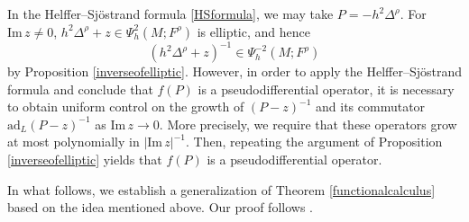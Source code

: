 \documentclass[11pt,oneside,reqno]{amsart}
\theoremstyle{definition}
\numberwithin{equation}{section}
\theoremstyle{plain}
\begin{document}
In the Helffer–Sjöstrand formula \eqref{HSformula}, we may take $P=-h^2\Delta^{\rho}$. For $\mathrm{Im}\,z\neq 0$, $h^2\Delta^{\rho} +z\in \Psi^{2}_h(M;F^\rho)$ is elliptic, and hence 
\begin{equation*}
    (h^2\Delta^{\rho} + z)^{-1}\in \Psi^{-2}_h(M;F^\rho)
\end{equation*}
by Proposition \ref{inverseofelliptic}. However, in order
to apply the Helffer–Sjöstrand formula and conclude that $f(P) $ is a pseudodifferential operator, 
it is necessary to obtain uniform control on the growth of $(P-z)^{-1}$ and its commutator $\mathrm{ad}_{L} (P-z)^{-1}$ as $\mathrm{Im}\,z \rightarrow 0$. More precisely, we require that these operators grow at most polynomially in $|\mathrm{Im}\, z|^{-1}$. Then, repeating the argument of Proposition \ref{inverseofelliptic} yields that $f(P)$ is a pseudodifferential operator.






In what follows, we establish a generalization of Theorem \ref{functionalcalculus} based on the idea mentioned above. Our proof follows \cite[Theorem 14.9]{zworski2012semiclassicalanalysis}.
\end{document}
